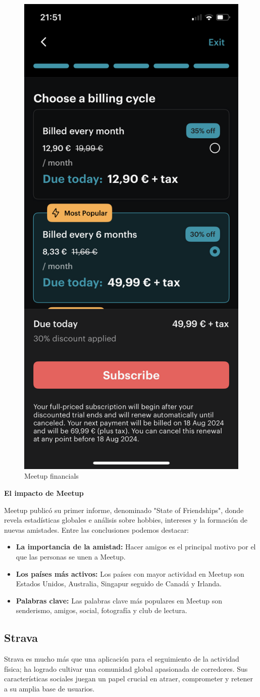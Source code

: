 \begin{figure}[H]
  \centering
  \includegraphics[cframe=black 2pt,width=0.3\linewidth]{images/estadodelarte/meetuporganizerprice.png}
  \caption{Meetup financials}
  \label{fig:meetup_financials}
\end{figure}

\textbf{El impacto de Meetup}

Meetup publicó su primer informe, denominado "State of Friendships"\cite{REF16}, donde revela estadísticas globales e análisis sobre hobbies, 
intereses y la formación de nuevas amistades.
Entre las conclusiones podemos destacar:
\begin{itemize}
  \item \textbf{La importancia de la amistad:} Hacer amigos es el principal motivo por el que las personas se unen a Meetup.
  \item \textbf{Los países más activos:} Los países con mayor actividad en Meetup son Estados Unidos, Australia, Singapur seguido de Canadá y Irlanda.
  \item \textbf{Palabras clave:} Las palabras clave más populares en Meetup son senderismo, amigos, social, fotografía y club de lectura.
\end{itemize}
\subsection{Strava}

Strava es mucho más que una aplicación para el seguimiento de la actividad física; ha logrado cultivar una comunidad global apasionada de corredores. 
Sus características sociales juegan un papel crucial en atraer, comprometer y retener a su amplia base de usuarios.

